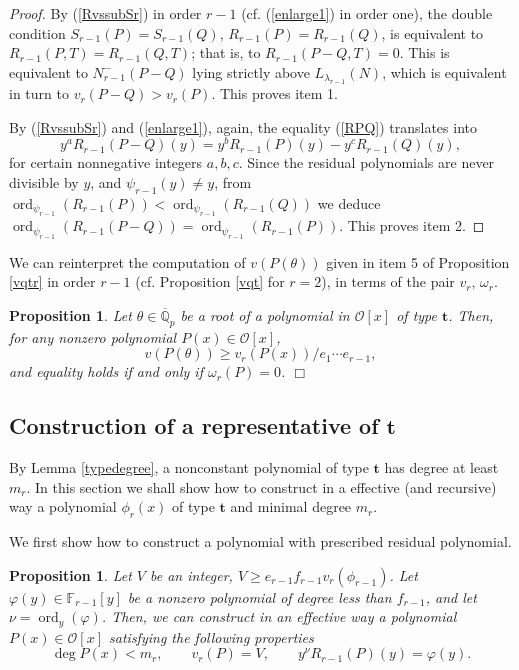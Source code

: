 \documentclass{amsart}
\newtheorem{proposition}[theorem]{Proposition}
\def\op{\operatorname}
\def\dg{\op{deg}}
\def\ff#1{\mathbb{F}_{#1}}
\def\la{\lambda}
\def\om{\omega}
\def\oo{{\mathcal O}}
\def\ord{\op{ord}}
\def\qpb{\overline{\mathbb{Q}}_p}
\def\t{\theta}
\def\ty{\mathbf{t}}
\def\zpx{\oo[x]}
\begin{document}
\begin{proof}
By (\ref{RvssubSr}) in order $r-1$ (cf. (\ref{enlarge1}) in order one), the double condition $S_{r-1}(P)=S_{r-1}(Q)$, 
$R_{r-1}(P)=R_{r-1}(Q)$, is equivalent to $R_{r-1}(P,T)=R_{r-1}(Q,T)$; that is, to $R_{r-1}(P-Q,T)=0$. This is equivalent to $N_{r-1}^-(P-Q)$ lying strictly above $L_{\la_{r-1}}(N)$, which is equivalent in turn to $v_r(P-Q)>v_r(P)$. This proves item 1.


By (\ref{RvssubSr}) and (\ref{enlarge1}), again, the equality (\ref{RPQ}) translates into 
$$
y^aR_{r-1}(P-Q)(y)=y^bR_{r-1}(P)(y)-y^cR_{r-1}(Q)(y),
$$
for certain nonnegative integers $a,b,c$. 
Since the residual polynomials are never divisible by $y$, and $\psi_{r-1}(y)\ne y$, from $\ord_{\psi_{r-1}}(R_{r-1}(P))<\ord_{\psi_{r-1}}(R_{r-1}(Q))$ we deduce $\ord_{\psi_{r-1}}(R_{r-1}(P-Q))=\ord_{\psi_{r-1}}(R_{r-1}(P))$.   This proves item 2.
\end{proof}


We can reinterpret the computation of $v(P(\t))$ given in item 5 of Proposition \ref{vqtr} in order $r-1$ (cf. Proposition \ref{vqt} for $r=2$), in terms of the pair $v_r,\,\om_r$.

\begin{proposition}\label{vpt}
Let $\t\in\qpb$ be a root of a polynomial in $\zpx$ of type $\ty$. Then, for any nonzero polynomial $P(x)\in\zpx$, 
$$v(P(\t))\ge v_r(P(x))/e_1\cdots e_{r-1},$$
and equality holds if and only if $\om_r(P)=0$. \hfill{$\Box$}
\end{proposition}

\subsection{Construction of a representative of $\ty$}
By Lemma \ref{typedegree}, a nonconstant polynomial of type $\ty$ has degree at least $m_r$. In this section  
we shall show how to construct in a effective (and recursive) way a polynomial $\phi_r(x)$ of type $\ty$ and minimal degree $m_r$. 

We first show how to construct a polynomial with  prescribed residual polynomial.
\begin{proposition}\label{construct}
Let $V$ be an integer, $V\ge e_{r-1}f_{r-1}v_r(\phi_{r-1})$.
Let $\varphi(y)\in\ff{r-1}[y]$ be a nonzero polynomial of degree less than $f_{r-1}$, and let $\nu=\ord_{y}(\varphi)$. 
Then, we can construct in an effective way a polynomial $P(x)\in\zpx$ satisfying the following properties
$$\dg P(x)<m_r,\qquad v_r(P)=V, \qquad y^{\nu}R_{r-1}(P)(y)=\varphi(y) .
$$ 
\end{proposition}
\end{document}
